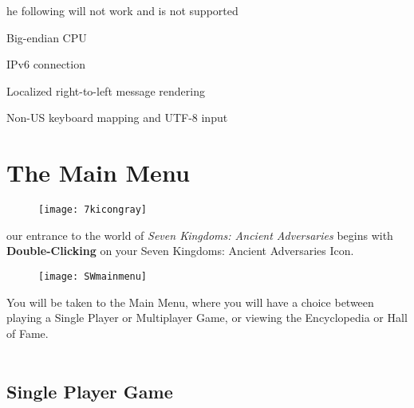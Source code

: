 he following will not work and is not supported

\begin{changemargin}{0.5cm}{0cm} 
Big-endian CPU

IPv6 connection

Localized right-to-left message rendering

Non-US keyboard mapping and UTF-8 input
\end{changemargin}

\section{\textsf{The Main Menu}}


\begin{wrapfigure}{r}{0.1\textwidth}
	\vspace{-20pt}
	\begin{center}
		\texttt{[image: 7kicongray]}
	\end{center}
	\vspace{-20pt}
\end{wrapfigure}

our entrance to the world of \textit{Seven Kingdoms: Ancient Adversaries} begins with \textbf{Double-Clicking} on your Seven Kingdoms: Ancient Adversaries Icon.

\begin{wrapfigure}{r}{0.4\textwidth}
    \begin{center}
        \vspace{-20pt}
        \texttt{[image: SWmainmenu]} %
    \end{center}
    \vspace{-20pt}
\end{wrapfigure}

You will be taken to the Main Menu, where you will have a choice between playing a Single Player or Multiplayer Game, or viewing the Encyclopedia or Hall of Fame. \\ \\ %

\subsection{\textsf{Single Player Game}}


